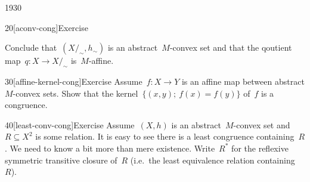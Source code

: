 \begin{parsec}{1930}
\begin{point}{20}[aconv-cong]{Exercise}
\begin{enumerate}
\begin{equation*}
\end{equation*}
Conclude that~$(X/_\sim,h_\sim)$ is an abstract~$M$-convex set
    and that the qoutient map~$q\colon X \to X/_\sim$ is~$M$-affine.
\end{enumerate}
\end{point}
\begin{point}{30}[affine-kernel-cong]{Exercise}%
Assume~$f\colon X \to Y$ is an affine map between abstract
    $M$-convex sets.
Show that the kernel~$\{(x,y);\ f(x) = f(y)\}$ of~$f$
    is a congruence.
\end{point}
\begin{point}{40}[least-conv-cong]{Exercise}%
Assume~$(X,h)$ is an abstract~$M$-convex set and~$R \subseteq X^2$
    is some relation.
It is easy to see there is a least congruence containing~$R$.
We need to know a bit more than mere existence.
Write~$R^*$ for the reflexive symmetric transitive closure of~$R$
    (i.e.~the least equivalence relation containing~$R$).


\end{point}
\end{parsec}
